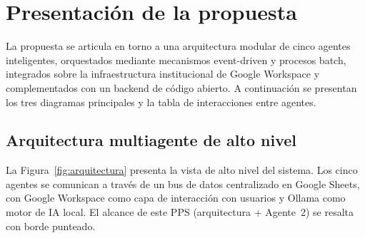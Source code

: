 \documentclass[a4paper, 12pt]{article}
\begin{document}
\section{Presentaci\'on de la propuesta}

La propuesta se articula en torno a una arquitectura modular de cinco agentes inteligentes, orquestados mediante mecanismos event-driven y procesos batch, integrados sobre la infraestructura institucional de Google Workspace y complementados con un backend de c\'odigo abierto. A continuaci\'on se presentan los tres diagramas principales y la tabla de interacciones entre agentes.

\subsection{Arquitectura multiagente de alto nivel}

La Figura~\ref{fig:arquitectura} presenta la vista de alto nivel del sistema. Los cinco agentes se comunican a trav\'es de un bus de datos centralizado en Google Sheets, con Google Workspace como capa de interacci\'on con usuarios y Ollama como motor de IA local. El alcance de este PPS (arquitectura + Agente~2) se resalta con borde punteado.
\end{document}
